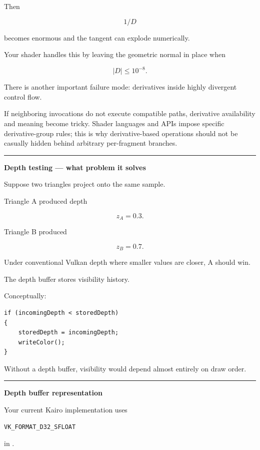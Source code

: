 Then

\[
1/D
\]

becomes enormous and the tangent can explode numerically.

Your shader handles this by leaving the geometric normal in place when

\[
|D|\le10^{-8}.
\]

There is another important failure mode: derivatives inside highly divergent control flow.

If neighboring invocations do not execute compatible paths, derivative availability and meaning become tricky. Shader languages and APIs impose specific derivative-group rules; this is why derivative-based operations should not be casually hidden behind arbitrary per-fragment branches.

\begin{center}\rule{0.5\linewidth}{0.5pt}\end{center}

\textbf{Depth testing --- what problem it solves}

Suppose two triangles project onto the same sample.

Triangle A produced depth

\[
z_A=0.3.
\]

Triangle B produced

\[
z_B=0.7.
\]

Under conventional Vulkan depth where smaller values are closer, A should win.

The depth buffer stores visibility history.

Conceptually:

\begin{verbatim}
if (incomingDepth < storedDepth)
{
    storedDepth = incomingDepth;
    writeColor();
}
\end{verbatim}

Without a depth buffer, visibility would depend almost entirely on draw order.

\begin{center}\rule{0.5\linewidth}{0.5pt}\end{center}

\textbf{Depth buffer representation}

Your current Kairo implementation uses

\begin{verbatim}
VK_FORMAT_D32_SFLOAT
\end{verbatim}

in .

